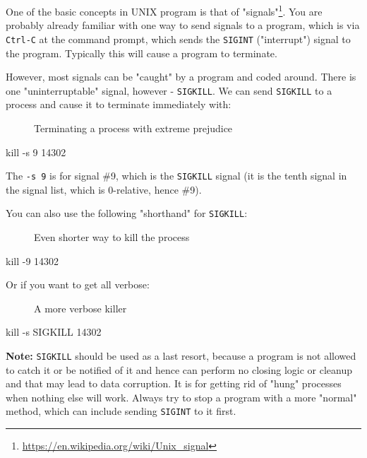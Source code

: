 \documentclass[10pt,american,]{book}
\newenvironment{Shaded}{\begin{snugshade}}{\end{snugshade}}
\newcommand{\KeywordTok}[1]{\textcolor[rgb]{0.13,0.29,0.53}{\textbf{{#1}}}}
\newcommand{\NormalTok}[1]{{#1}}
\renewcommand{\href}[2]{#2\footnote{\url{#1}}}
\numberwithin{figure}{chapter}
\DeclareRobustCommand{\drcap}[1]{\begin{figure}[H]\caption{#1}\end{figure}}
\renewcommand{\KeywordTok}[1]{{#1}}
\renewcommand{\NormalTok}[1]{{#1}}
\begin{document}
One of the basic concepts in UNIX program is that of
\href{https://en.wikipedia.org/wiki/Unix_signal}{"signals"}.
You are probably already familiar with one way to send signals to a
program, which is via \texttt{Ctrl-C} at the command prompt, which sends
the \texttt{SIGINT} ("interrupt") signal to the program. Typically this
will cause a program to terminate.

However, most signals can be "caught" by a program and coded around.
There is one "uninterruptable" signal, however - \texttt{SIGKILL}. We
can send \texttt{SIGKILL} to a process and cause it to terminate
immediately with:

\drcap{Terminating a process with extreme prejudice}

\begin{Shaded}
\begin{Highlighting}[]
\KeywordTok{kill} \NormalTok{-s 9 14302}
\end{Highlighting}
\end{Shaded}

The \texttt{-s\ 9} is for signal \#9, which is the \texttt{SIGKILL}
signal (it is the tenth signal in the signal list, which is 0-relative,
hence \#9).

You can also use the following "shorthand" for \texttt{SIGKILL}:

\drcap{Even shorter way to kill the process}

\begin{Shaded}
\begin{Highlighting}[]
\KeywordTok{kill} \NormalTok{-9 14302}
\end{Highlighting}
\end{Shaded}

Or if you want to get all verbose:

\drcap{A more verbose killer}

\begin{Shaded}
\begin{Highlighting}[]
\KeywordTok{kill} \NormalTok{-s SIGKILL 14302}
\end{Highlighting}
\end{Shaded}

\textbf{Note:} \texttt{SIGKILL} should be used as a last resort, because
a program is not allowed to catch it or be notified of it and hence can
perform no closing logic or cleanup and that may lead to data
corruption. It is for getting rid of "hung" processes when nothing else
will work. Always try to stop a program with a more "normal" method,
which can include sending \texttt{SIGINT} to it first.
\end{document}
